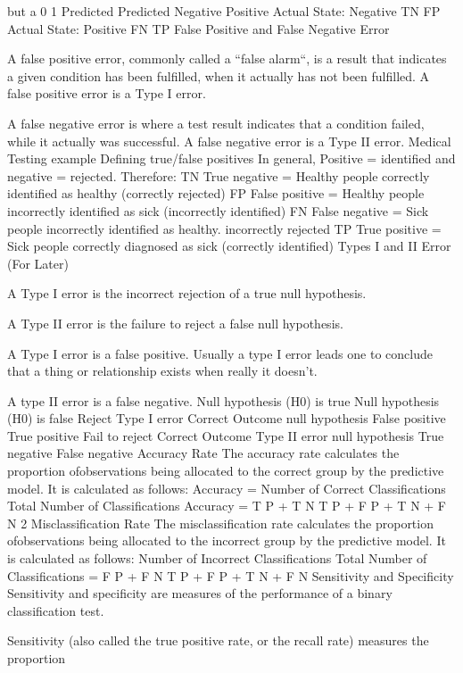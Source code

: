\documentclass[a4paper,12pt]{article}
\begin{document}
but a 0%
1
Predicted Predicted
Negative Positive
Actual State: Negative TN FP
Actual State: Positive FN TP
False Positive and False Negative Error
\item  A false positive error, commonly called a “false alarm“, is a result that indicates a given
condition has been fulfilled, when it actually has not been fulfilled. A false positive error is
a Type I error.
\item  A false negative error is where a test result indicates that a condition failed, while it actually
was successful. A false negative error is a Type II error.
Medical Testing example Defining true/false positives
In general, Positive = identified and negative = rejected. Therefore:
TN True negative = Healthy people correctly identified as healthy (correctly rejected)
FP False positive = Healthy people incorrectly identified as sick (incorrectly identified)
FN False negative = Sick people incorrectly identified as healthy. incorrectly rejected
TP True positive = Sick people correctly diagnosed as sick (correctly identified)
Types I and II Error (For Later)
\item  A Type I error is the incorrect rejection of a true null hypothesis.
\item  A Type II error is the failure to reject a false null hypothesis.
\item  A Type I error is a false positive. Usually a type I error leads one to conclude that a thing
or relationship exists when really it doesn’t.
\item  A type II error is a false negative.
Null hypothesis (H0) is true Null hypothesis (H0) is false
Reject Type I error Correct Outcome
null hypothesis False positive True positive
Fail to reject Correct Outcome Type II error
null hypothesis True negative False negative
Accuracy Rate
The accuracy rate calculates the proportion ofobservations being allocated to the correct group
by the predictive model. It is calculated as follows:
Accuracy = Number of Correct Classifications
Total Number of Classifications
Accuracy = T P + T N
T P + F P + T N + F N
2
Misclassification Rate
The misclassification rate calculates the proportion ofobservations being allocated to the incorrect
group by the predictive model. It is calculated as follows:
Number of Incorrect Classifications
Total Number of Classifications
=
F P + F N
T P + F P + T N + F N
Sensitivity and Specificity
Sensitivity and specificity are measures of the performance of a binary classification test.
\item  Sensitivity (also called the true positive rate, or the recall rate) measures the proportion
\end{document}

